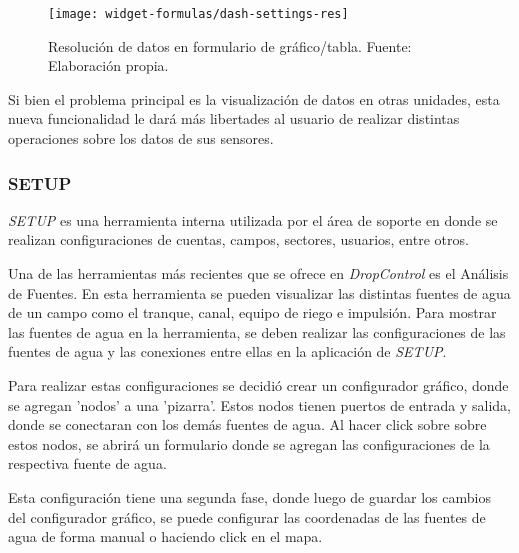 \begin{figure}[H]
	\centering
	\texttt{[image: widget-formulas/dash-settings-res]}
	\caption{\label{fig:dash-settings-res} Resolución de datos en formulario de gráfico/tabla. Fuente: Elaboración propia.}
\end{figure}

Si bien el problema principal es la visualización de datos en otras unidades, esta nueva funcionalidad le dará más libertades al usuario de realizar distintas operaciones sobre los datos de sus sensores.

\iffalse
\subsubsection{SETUP}

\textit{SETUP} es una herramienta interna utilizada por el área de soporte en donde se realizan configuraciones de cuentas, campos, sectores, usuarios, entre otros.


Una de las herramientas más recientes que se ofrece en \textit{DropControl} es el Análisis de Fuentes. En esta herramienta se pueden visualizar las distintas fuentes de agua de un campo como el tranque, canal, equipo de riego e impulsión.
Para mostrar las fuentes de agua en la herramienta, se deben realizar las configuraciones de las fuentes de agua y las conexiones entre ellas en la aplicación de \textit{SETUP}.

Para realizar estas configuraciones se decidió crear un configurador gráfico, donde se agregan 'nodos' a una 'pizarra'. Estos nodos tienen puertos de entrada y salida, donde se conectaran con los demás fuentes de agua. Al hacer click sobre sobre estos nodos, se abrirá un formulario donde se agregan las configuraciones de la respectiva fuente de agua.

Esta configuración tiene una segunda fase, donde luego de guardar los cambios del configurador gráfico, se puede configurar las coordenadas de las fuentes de agua de forma manual o haciendo click en el mapa.

